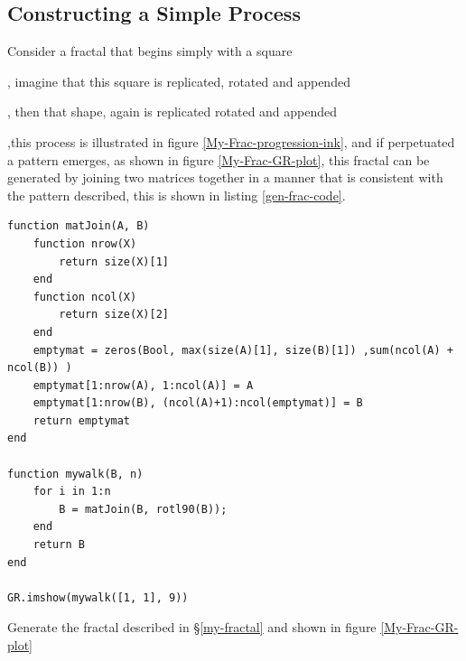 \documentclass[a4paper,11pt,twoside]{article}
\begin{document}
\subsection{Constructing a Simple Process}
\label{sec:org0ebf6aa}

Consider a fractal that begins simply with a square
  ,
imagine that this square is replicated, rotated and appended
, then that shape, again is replicated rotated and appended
,this    process is illustrated in figure \ref{My-Frac-progression-ink}, and if perpetuated a pattern emerges, as shown in figure \ref{My-Frac-GR-plot}, this fractal can be generated by joining two matrices together in a manner that is consistent with the pattern described, this is shown in listing \ref{gen-frac-code}.

\begin{listing}[htbp]
\begin{verbatim}
function matJoin(A, B)
    function nrow(X)
        return size(X)[1]
    end
    function ncol(X)
        return size(X)[2]
    end
    emptymat = zeros(Bool, max(size(A)[1], size(B)[1]) ,sum(ncol(A) + ncol(B)) )
    emptymat[1:nrow(A), 1:ncol(A)] = A
    emptymat[1:nrow(B), (ncol(A)+1):ncol(emptymat)] = B
    return emptymat
end

function mywalk(B, n)
    for i in 1:n
        B = matJoin(B, rotl90(B));
    end
    return B
end

GR.imshow(mywalk([1, 1], 9))
\end{verbatim}
\caption{\label{gen-frac-code}Generate the fractal described in \S \ref{my-fractal} and shown in figure \ref{My-Frac-GR-plot}}
\end{listing}
\end{document}
